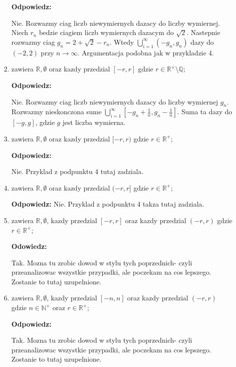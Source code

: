 \documentclass{article}
\begin{document}
\begin{enumerate}
\begin{enumerate}[label={$T_{\arabic*} :$}]
                \textbf{Odpowiedz:}

                Nie. Rozwazmy ciag liczb niewymiernych dazacy do liczby wymiernej. Niech $r_{n}$ bedzie ciagiem liczb wymiernych dazacym do $\sqrt{2}$. Nastepnie rozwazmy ciag $g_{n} = 2+\sqrt{2} - r_{n}$. Wtedy $\bigcup\limits_{i=1}^{\infty}(-g_{n}, g_{n})$ dazy do $(-2,2)$ przy $n \rightarrow \infty$. Argumentacja podobna jak w przykladzie 4.
            \item zawiera $\mathbb{R}, \emptyset$ oraz kazdy przedzial $[-r,r]$ gdzie $r \in {\mathbb{R}}^{+} \setminus \mathbb{Q}$;

                \textbf{Odpowiedz:}

                Nie. Rozwazmy ciag liczb niewymiernych dazacy do liczby wymiernej $g_{n}$. Rozwazmy nieskonczona sume $\bigcup\limits_{i=1}^{\infty}[-g_{n} + \frac{1}{n}, g_{n} - \frac{1}{n}]$. Suma ta dazy do $[-g, g]$, gdzie $g$ jest liczba wymierna.
            \item zawiera $\mathbb{R}, \emptyset$ oraz kazdy przedzial $[-r,r)$ gdzie $r \in {\mathbb{R}}^{+}$;

                \textbf{Odpowiedz:}

                Nie. Przyklad z podpunktu 4 tutaj zadziala.
            \item zawiera $\mathbb{R}, \emptyset$ oraz kazdy przedzial $(-r,r]$ gdzie $r \in {\mathbb{R}}^{+}$;

                \textbf{Odpowiedz:}
                Nie. Przyklad z podpunktu 4 takza tutaj zadziala.
            \item zawiera $\mathbb{R}, \emptyset$, kazdy przedzial $[-r,r]$ oraz kazdy przedzial $(-r,r)$ gdzie $r \in {\mathbb{R}}^{+}$;

                \textbf{Odowiedz:}

                Tak. Mozna tu zrobic dowod w stylu tych poprzednich- czyli przeanalizowac wszystkie przypadki, ale poczekam na cos lepszego. Zostanie to tutaj uzupelnione.
            \item zawiera $\mathbb{R}, \emptyset$, kazdy przedzial $[-n,n]$ oraz kazdy przedzial $(-r,r)$ gdzie $n \in {\mathbb{N}}^{+}$ oraz  $r \in {\mathbb{R}}^{+}$;

                \textbf{Odpowiedz:}

                Tak. Mozna tu zrobic dowod w stylu tych poprzednich- czyli przeanalizowac wszystkie przypadki, ale poczekam na cos lepszego. Zostanie to tutaj uzupelnione.
        \end{enumerate}


\end{enumerate}%
\end{document}
